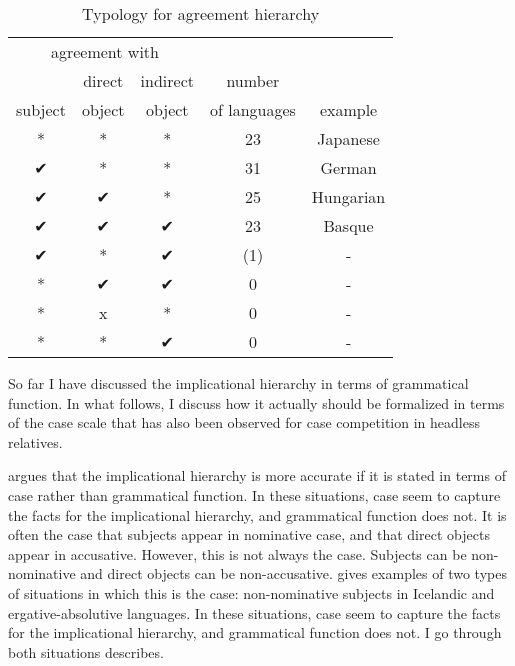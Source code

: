  \begin{table}[H]
   \center
   \caption {Typology for agreement hierarchy}
     \begin{tabular}[t]{ccccc}
       \toprule
           \multicolumn{3}{c}{agreement with} &              &         \\
       \cmidrule{1-3}
                    & direct & indirect       & number       &         \\
           subject  & object & object         & of languages & example \\
       \cmidrule{1-3} \cmidrule{4-4} \cmidrule{5-5}
           *    & * & * & 23  & Japanese    \\
           ✔    & * & * & 31  & German     \\
           ✔    & ✔ & * & 25  & Hungarian  \\
           ✔    & ✔ & ✔ & 23  & Basque     \\
           ✔    & * & ✔ & (1) & -          \\
           {*}  & ✔ & ✔ & 0   & -          \\
           {*}  & x & * & 0   & -          \\
           {*}  & * & ✔ & 0   & -          \\
       \bottomrule
     \end{tabular}
     \label{tbl:agr-typo}
 \end{table}

So far I have discussed the implicational hierarchy in terms of grammatical function. In what follows, I discuss how it actually should be formalized in terms of the case scale that has also been observed for case competition in headless relatives.

\citet{bobaljik2006} argues that the implicational hierarchy is more accurate if it is stated in terms of case rather than grammatical function. In these situations, case seem to capture the facts for the implicational hierarchy, and grammatical function does not. It is often the case that subjects appear in nominative case, and that direct objects appear in accusative. However, this is not always the case. Subjects can be non-nominative and direct objects can be non-accusative. \citeauthor{bobaljik2006} gives examples of two types of situations in which this is the case: non-nominative subjects in Icelandic and ergative-absolutive languages. In these situations, case seem to capture the facts for the implicational hierarchy, and grammatical function does not. I go through both situations \citeauthor{bobaljik2006} describes.

